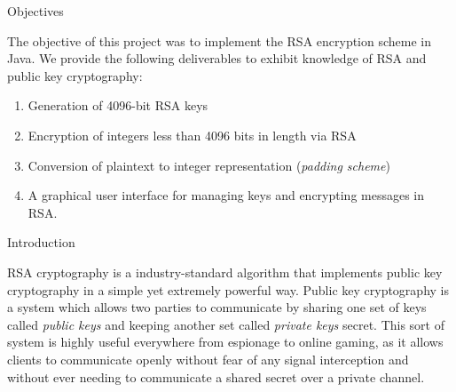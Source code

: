 \documentclass[landscape,fontscale=.8,paperwidth=24in,paperheight=18in]{baposter} %
\newcommand{\compresslist}{ %
\setlength{\itemsep}{1pt}
\setlength{\parskip}{0pt}
\setlength{\parsep}{0pt}
}
\begin{document}
\begin{poster}

\begin{posterbox}[name=objectives,column=0,row=0,span=13]{Objectives}

The objective of this project was to implement the RSA encryption scheme in Java. We provide the following deliverables to exhibit knowledge of RSA and public key cryptography:

\begin{enumerate}\compresslist
\item Generation of 4096-bit RSA keys
\item Encryption of integers less than 4096 bits in length via RSA
\item Conversion of plaintext to integer representation (\emph{padding scheme})
\item A graphical user interface for managing keys and encrypting messages in RSA.
\end{enumerate}

\vspace{0.3em} %
\end{posterbox}


\begin{posterbox}[name=intro,column=0,below=objectives, span=13]{Introduction}

RSA cryptography is a industry-standard algorithm that implements public key cryptography in a simple yet extremely powerful way. Public key cryptography is a system which allows two parties to communicate by sharing one set of keys called \emph{public keys} and keeping another set called \emph{private keys} secret. This sort of system is highly useful everywhere from espionage to online gaming, as it allows clients to communicate openly without fear of any signal interception and without ever needing to communicate a shared secret over a private channel.


\end{posterbox}
\end{poster}
\end{document}
